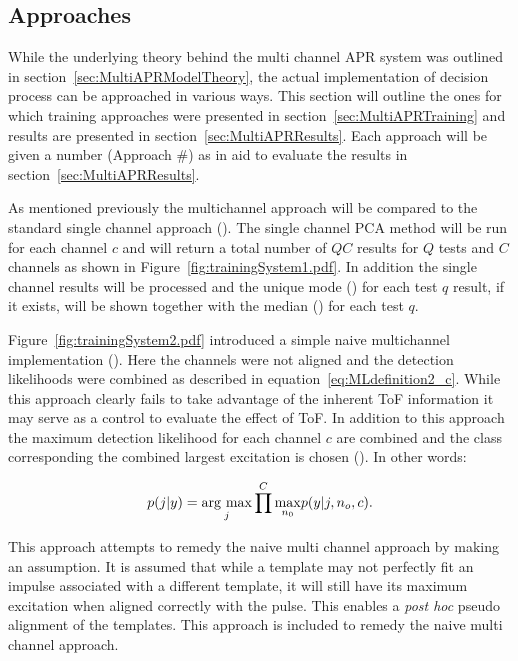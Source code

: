 \subsection{Approaches}
While the underlying theory behind the multi channel APR system was outlined in section~\ref{sec:MultiAPRModelTheory}, the actual implementation of decision process can be approached in various ways. This section will outline the ones for which training approaches were presented in section~\ref{sec:MultiAPRTraining} and results are presented in section~\ref{sec:MultiAPRResults}. Each approach will be given a number (Approach \#) as in aid to evaluate the results in section~\ref{sec:MultiAPRResults}.

As mentioned previously the multichannel approach will be compared to the standard single channel approach (). The single channel PCA method will be run for each channel $c$ and will return a total number of $QC$ results for $Q$ tests and $C$ channels as shown in Figure~\ref{fig:trainingSystem1.pdf}. In addition the single channel results will be processed and the unique mode () for each test $q$ result, if it exists, will be shown together with the median () for each test $q$.

Figure~\ref{fig:trainingSystem2.pdf} introduced a simple naive multichannel implementation (). Here the channels were not aligned and the detection likelihoods were combined as described in equation~\ref{eq:MLdefinition2_c}. While this approach clearly fails to take advantage of the inherent ToF information it may serve as a control to evaluate the effect of ToF. In addition to this approach the maximum detection likelihood for each channel $c$ are combined and the class corresponding the combined largest excitation is chosen (). In other words:

\begin{equation}\label{eq:jointprob3_c}
p(j|y) = \underset{j}{\mathrm{arg~max}} \prod^C \underset{n_0}{\max} p(y|j,n_o,c).
\end{equation}

This approach attempts to remedy the naive multi channel approach by making an assumption. It is assumed that while a template may not perfectly fit an impulse associated with a different template, it will still have its maximum excitation when aligned correctly with the pulse. This enables a \emph{post hoc} pseudo alignment of the templates. This approach is included to remedy the naive multi channel approach.

